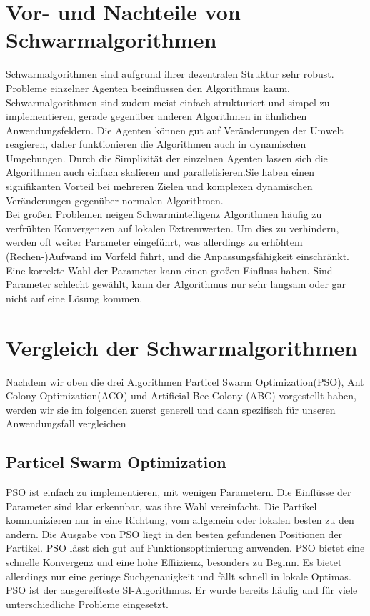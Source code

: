 \section{Vor- und Nachteile von Schwarmalgorithmen}
\label{sec:comparison}
Schwarmalgorithmen sind aufgrund ihrer dezentralen Struktur sehr robust. Probleme einzelner Agenten beeinflussen den Algorithmus kaum. Schwarmalgorithmen sind zudem meist einfach strukturiert und simpel zu implementieren, gerade gegenüber anderen Algorithmen in ähnlichen Anwendungsfeldern. Die Agenten können gut auf Veränderungen der Umwelt reagieren, daher funktionieren die Algorithmen auch in dynamischen Umgebungen. Durch die Simplizität der einzelnen Agenten lassen sich die Algorithmen auch einfach skalieren und parallelisieren.Sie haben einen signifikanten Vorteil bei mehreren Zielen und komplexen dynamischen Veränderungen gegenüber normalen Algorithmen. \\

Bei großen Problemen neigen Schwarmintelligenz Algorithmen häufig zu verfrühten Konvergenzen auf lokalen Extremwerten. Um dies zu verhindern, werden oft weiter Parameter eingeführt, was allerdings zu erhöhtem (Rechen-)Aufwand im Vorfeld führt, und die Anpassungsfähigkeit einschränkt.\cite {wu2022review} Eine korrekte Wahl der Parameter kann einen großen Einfluss haben. Sind Parameter schlecht gewählt, kann der Algorithmus nur sehr langsam oder gar nicht auf eine Lösung kommen.

\section{Vergleich der Schwarmalgorithmen}

Nachdem wir oben die drei Algorithmen Particel Swarm Optimization(PSO), Ant Colony Optimization(ACO) und  Artificial Bee Colony (ABC) vorgestellt haben, werden wir sie im folgenden zuerst generell und dann spezifisch für unseren Anwendungsfall vergleichen\\

\subsection{Particel Swarm Optimization}
PSO ist einfach zu implementieren, mit wenigen Parametern. Die Einflüsse der Parameter sind klar erkennbar, was ihre Wahl vereinfacht. Die Partikel kommunizieren nur in eine Richtung, vom allgemein oder lokalen besten zu den andern. Die Ausgabe von PSO liegt in den besten gefundenen Positionen der Partikel. PSO lässt sich gut auf Funktionsoptimierung anwenden. PSO bietet eine schnelle Konvergenz und eine hohe Effiizienz, besonders zu Beginn. Es bietet allerdings nur eine geringe Suchgenauigkeit und fällt schnell in lokale Optimas. \cite {yu2015swarm} PSO ist der ausgereifteste SI-Algorithmus. Er wurde bereits häufig und für viele unterschiedliche Probleme eingesetzt. 



